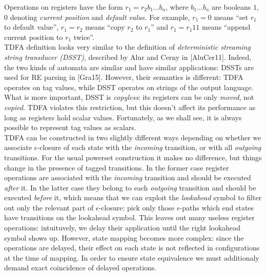 \documentclass{article}
\newcommand{\Xeq}{\!=\!}
\theoremstyle{definition}
\begin{document}
\begin{multicols}{2}
Operations on registers have the form $r_1 \Xeq r_2 b_1 \dots b_n$, where $b_1 \dots b_n$ are booleans 
$1$, $0$ denoting \emph{current position} and \emph{default value}.
For example, $r_1 \Xeq 0$ means ``set $r_1$ to default value'',
$r_1 \Xeq r_2$ means ``copy $r_2$ to $r_1$'' and
$r_1 \Xeq r_1 1 1$ means ``append current position to $r_1$ twice''.
\\

TDFA definition looks very similar to the definition of
\emph{deterministic streaming string transducer (DSST)}, described by Alur and Cerny in [AluCer11].
Indeed, the two kinds of automata are similar and have similar applications: DSSTs are used for RE parsing in [Gra15].
However, their semantics is different: TDFA operates on tag values, while DSST operates on strings of the output language.
What is more important, DSST is \emph{copyless}:
its registers can be only \emph{moved}, not \emph{copied}.
TDFA violates this restriction, but this doesn't affect its performance as long as registers hold scalar values.
Fortunately, as we shall see, it is always possible to represent tag values as scalars.
\\

TDFA can be constructed in two slightly different ways
depending on whether we associate $\epsilon$-closure of each state with the \emph{incoming} transition,
or with all \emph{outgoing} transitions.
For the usual powerset construction it makes no difference, but things change in the presence of tagged transitions.
In the former case register operations are associated with the \emph{incoming} transition and should be executed \emph{after} it.
In the latter case they belong to each \emph{outgoing} transition and should be executed \emph{before} it,
which means that we can exploit the \emph{lookahead} symbol to filter out only the relevant part of $\epsilon$-closure:
pick only those $\epsilon$-paths which end states have transitions on the lookahead symbol.
This leaves out many useless register operations:
intuituvely, we delay their application until the right lookahead symbol shows up.
However, state mapping becomes more complex:
since the operations are delayed,
their effect on each state is not reflected in configurations at the time of mapping.
In order to ensure state equivalence we must additionaly demand exact coincidence of delayed operations.
\\


\end{multicols}
\end{document}
